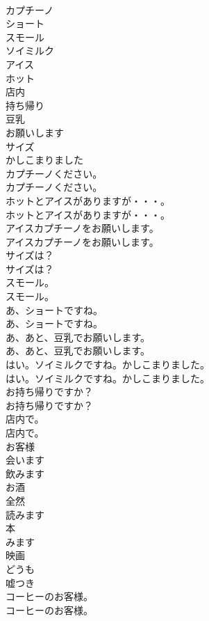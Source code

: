 \documentclass[8pt]{extreport}
\begin{document}
\begin{CJK}{UTF8}{min}
\\	カプチーノ
\\	ショート
\\	スモール
\\	ソイミルク
\\	アイス
\\	ホット
\\	店内
\\	持ち帰り
\\	豆乳
\\	お願いします
\\	サイズ
\\	かしこまりました
\\	カプチーノください。	
\\	カプチーノください。 
\\	ホットとアイスがありますが・・・。	
\\	ホットとアイスがありますが・・・。 
\\	アイスカプチーノをお願いします。	
\\	アイスカプチーノをお願いします。 
\\	サイズは？	
\\	サイズは？ 
\\	スモール。	
\\	スモール。 
\\	あ、ショートですね。	
\\	あ、ショートですね。 
\\	あ、あと、豆乳でお願いします。	
\\	あ、あと、豆乳でお願いします。 
\\	はい。ソイミルクですね。かしこまりました。	
\\	はい。ソイミルクですね。かしこまりました。 
\\	お持ち帰りですか？	
\\	お持ち帰りですか？ 
\\	店内で。	
\\	店内で。 
\\	お客様
\\	会います
\\	飲みます
\\	お酒
\\	全然
\\	読みます
\\	本
\\	みます
\\	映画
\\	どうも
\\	嘘つき
\\	コーヒーのお客様。	
\\	コーヒーのお客様。 

\end{CJK}
\end{document}
